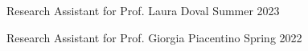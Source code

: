 

\begin{cventries}

\cventrysimple
	{Research Assistant for Prof. Laura Doval}  %
    {Summer 2023} %
    {}
    
\cventrysimple
    {Research Assistant for Prof. Giorgia Piacentino}  %
    {Spring 2022} %
    {}
	

\end{cventries}
